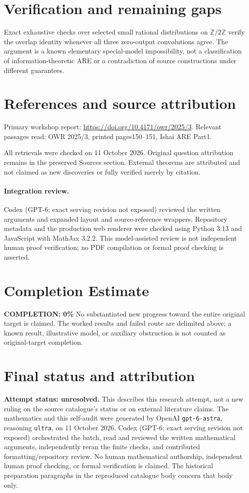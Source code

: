 \documentclass[11pt]{article}
\begin{document}
\section{Verification and remaining gaps}
Exact exhaustive checks over selected small rational distributions on $\mathbb Z/2\mathbb Z$ verify the overlap identity whenever all three zero-output convolutions agree. The argument is a known elementary special-model impossibility, not a classification of information-theoretic ARE or a contradiction of source constructions under different guarantees.

\section{References and source attribution}
Primary workshop report: \url{https://doi.org/10.4171/owr/2025/3}. Relevant passages read: OWR 2025/3, printed pages150--151, Ishai ARE Part1.

All retrievals were checked on 11 October 2026. Original question attribution remains in the preserved Sources section. External theorems are attributed and not claimed as new discoveries or fully verified merely by citation.


\paragraph{Integration review.} Codex (GPT-6; exact serving revision not exposed) reviewed the written arguments and expanded layout and source-reference wrappers. Repository metadata and the production web renderer were checked using Python 3.13 and JavaScript with MathJax 3.2.2. This model-assisted review is not independent human proof verification; no PDF compilation or formal proof checking is asserted.

\section{Completion Estimate}
\noindent\textbf{COMPLETION: 0\%}
No substantiated new progress toward the entire original target is claimed. The worked results and failed route are delimited above; a known result, illustrative model, or auxiliary obstruction is not counted as original-target completion.

\section{Final status and attribution}
\textbf{Attempt status: unresolved.} This describes this research attempt, not a new ruling on the source catalogue's status or on external literature claims.
The mathematics and this self-audit were generated by OpenAI \texttt{gpt-6-astra}, reasoning \texttt{ultra}, on 11 October 2026. Codex (GPT-6; exact serving revision not exposed) orchestrated the batch, read and reviewed the written mathematical arguments, independently reran the finite checks, and contributed formatting/repository review. No human mathematical authorship, independent human proof checking, or formal verification is claimed. The historical preparation paragraphs in the reproduced catalogue body concern that body only.
\end{document}
